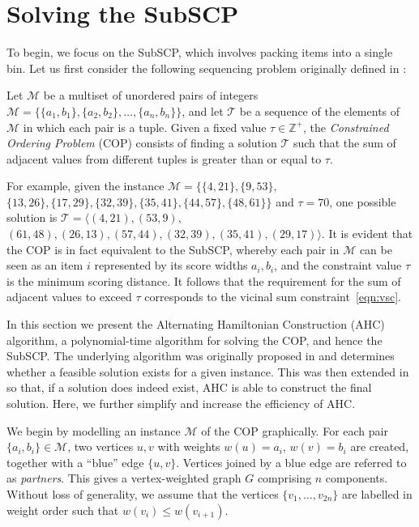 \documentclass{IEEEtran}
\begin{document}
\section{Solving the SubSCP}
\label{sec:ahc}
To begin, we focus on the SubSCP, which involves packing items into a single bin. Let us first consider the following sequencing problem originally defined in \cite{hawa2018}:

\begin{definition} %
	Let $\mathcal{M}$ be a multiset of unordered pairs of integers $\mathcal{M} = \{\{a_1, b_1\}, \{a_2, b_2\},\dotsc,\{a_n, b_n\}\}$, and let $\mathcal{T}$ be a sequence of the elements of $\mathcal{M}$ in which each pair is a tuple. Given a fixed value $\tau \in \mathbb{Z}^+$, the \emph{Constrained Ordering Problem} (COP) consists of finding a solution $\mathcal{T}$ such that the sum of adjacent values from different tuples is greater than or equal to $\tau$.
	\label{defn:cop}
\end{definition}

For example, given the instance $\mathcal{M} = \{\{4,21\}, \{9,53\},$ $\{13,26\}, \{17,29\}, \{32,39\}, \{35,41\}, \{44,57\}, \{48,61\} \}$ and $\tau = 70$, one possible solution is $\mathcal{T} = \langle(4,21), (53,9),$ $(61,48), (26,13), (57,44), (32,39), (35,41), (29,17)\rangle$. It is evident that the COP is in fact equivalent to the SubSCP, whereby each pair in $\mathcal{M}$ can be seen as an item $i$ represented by its score widths $a_i, b_i$, and the constraint value $\tau$ is the minimum scoring distance. It follows that the requirement for the sum of adjacent values to exceed $\tau$ corresponds to the vicinal sum constraint~\eqref{eqn:vsc}.

In this section we present the Alternating Hamiltonian Construction (AHC) algorithm, a polynomial-time algorithm for solving the COP, and hence the SubSCP. The underlying algorithm was originally proposed in \cite{becker2010} and determines whether a feasible solution exists for a given instance. This was then extended in \cite{hawa2018} so that, if a solution does indeed exist, AHC is able to construct the final solution. Here, we further simplify and increase the efficiency of AHC.

We begin by modelling an instance $\mathcal{M}$ of the COP graphically. For each pair $\{a_i, b_i\} \in \mathcal{M}$, two vertices $u, v$ with weights $w(u) = a_i$, $w(v) = b_i$ are created, together with a ``blue'' edge $\{u, v\}$. Vertices joined by a blue edge are referred to as \textit{partners}. This gives a vertex-weighted graph $G$ comprising $n$ components. Without loss of generality, we assume that the vertices $\{v_1,\dotsc,v_{2n}\}$ are labelled in weight order such that $w(v_i) \leq w(v_{i+1})$.
\end{document}
